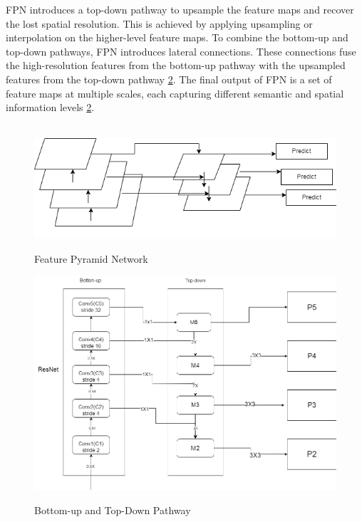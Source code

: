 \noindent FPN introduces a top-down pathway to upsample the feature maps and recover the lost spatial resolution. This is achieved by applying upsampling or interpolation on the higher-level feature maps. To combine the bottom-up and top-down pathways, FPN introduces lateral connections. These connections fuse the high-resolution features from the bottom-up pathway with the upsampled features from the top-down pathway \ref{fig:bottom}. The final output of FPN is a set of feature maps at multiple scales, each capturing different semantic and spatial information levels \ref{fig:bottom}.
\\\\

\begin{figure}[H]
\centering
	\includegraphics*[width = 12cm]{images/FPN.png}
	 \caption{Feature Pyramid Network}\cite{fpn}
	\label{fig:FPN}
\end{figure}

\begin{figure}[H]
\centering
	\includegraphics*[width = 13cm]{images/Bottom-up.png}
	 \caption{Bottom-up and Top-Down Pathway}\cite{fpn}
	\label{fig:bottom}
\end{figure}

